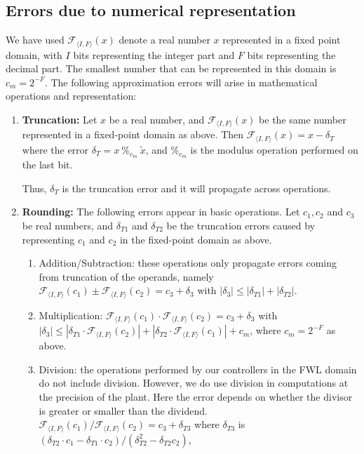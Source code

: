 \documentclass[runningheads,a4paper]{llncs}
\begin{document}
\subsection{Errors due to numerical representation} \label{appendix:numerical_errors}

We have  used $\mathcal{F}_{\langle I,F \rangle}(x)$ denote a real number
$x$ represented in a fixed point domain, with $I$ bits representing the
integer part and $F$ bits representing the decimal part.  The smallest
number that can be represented in this domain is $c_m=2^{-F}$.  The
following approximation errors will arise in mathematical operations and
representation:
%
\begin{enumerate}

\item {\bf Truncation:} Let $x$ be a real number, and $\mathcal{F}_{\langle
I,F \rangle}(x)$ be the same number represented in a fixed-point domain as
above.  Then $\mathcal{F}_{\langle I,F \rangle}(x) = x-\delta_T$ where the
error $ \delta_T=x\ \%_{c_m}\ \tilde x$, and $\%_{c_m}$ is the modulus
operation performed on the last bit.

Thus, $\delta_T$ is the truncation error and it will propagate across
operations.
%
\item {\bf Rounding:} The following errors appear in basic operations.  Let
$c_1, c_2$ and $c_3$ be real numbers, and $\delta_{T1}$ and $\delta_{T2}$ be
the truncation errors caused by representing $c_1$ and $c_2$ in the
fixed-point domain as above.
%
\begin{enumerate}
%
\item Addition/Subtraction: these operations only propagate errors coming
from truncation of the operands, namely $\mathcal{F}_{\langle I,F
\rangle}(c_1) \pm \mathcal{F}_{\langle I,F \rangle}(c_2) = c_3 + \delta_3$
with $|\delta_3| \leq |\delta_{T1}| + |\delta_{T2}|$.
%
\item Multiplication: $\mathcal{F}_{\langle I,F \rangle}(c_1) \cdot
\mathcal{F}_{\langle I,F \rangle}(c_2) =  c_3 + \delta_3$ with $|\delta_3|
\leq |\delta_{T1}\cdot\mathcal{F}_{\langle I,F \rangle}(c_2)|\allowbreak +
|\delta_{T2}\cdot\mathcal{F}_{\langle I,F \rangle}(c_1)| + c_m$, where
$c_m=2^{-F}$ as above.
%
\item Division: the operations performed by our controllers in the FWL
domain do not include division.  However, we do use division in computations
at the precision of the plant.  Here the error depends on whether the
divisor is greater or smaller than the dividend.  $\mathcal{F}_{\langle I,F
\rangle}(c_1) / \mathcal{F}_{\langle I,F \rangle}(c_2) = c_3 + \delta_{T3}$
where $\delta_{T3}$ is $(\delta_{T2}\cdot c_1 - \delta_{T1}\cdot
c_2)/(\delta_{T2}^2 - \delta_{T2} c_2)$,
%
\end{enumerate}


\end{enumerate}
\end{document}
